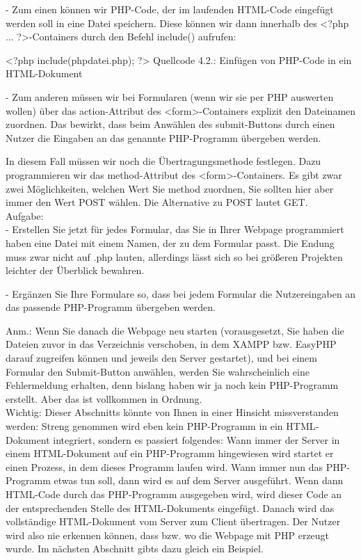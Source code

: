 -	Zum einen können wir PHP-Code, der im laufenden HTML-Code eingefügt werden soll in eine Datei speichern. Diese können wir dann innerhalb des <?php ... ?>-Containers durch den Befehl include() aufrufen:

<?php
include(phpdatei.php);
?>
Quellcode 4.2.: Einfügen von PHP-Code in ein HTML-Dokument

-	Zum anderen müssen wir bei Formularen (wenn wir sie per PHP auswerten wollen) über das action-Attribut des <form>-Containers explizit den Dateinamen zuordnen. Das bewirkt, dass beim Anwählen des submit-Buttons durch einen Nutzer die Eingaben an das genannte PHP-Programm übergeben werden.

In diesem Fall müssen wir noch die Übertragungsmethode festlegen. Dazu programmieren wir das method-Attribut des <form>-Containers. Es gibt zwar zwei Möglichkeiten, welchen Wert Sie method zuordnen, Sie sollten hier aber immer den Wert POST wählen. Die Alternative zu POST lautet GET.\\

Aufgabe:\\

-	Erstellen Sie jetzt für jedes Formular, das Sie in Ihrer Webpage programmiert haben eine Datei mit einem Namen, der zu dem Formular passt. Die Endung muss zwar nicht auf .php lauten, allerdings lässt sich so bei größeren Projekten leichter der Überblick bewahren.

-	Ergänzen Sie Ihre Formulare so, dass bei jedem Formular die Nutzereingaben an das passende PHP-Programm übergeben werden.

Anm.: Wenn Sie danach die Webpage neu starten (vorausgesetzt, Sie haben die Dateien zuvor in das Verzeichnis verschoben, in dem XAMPP bzw. EasyPHP darauf zugreifen können und jeweils den Server gestartet), und bei einem Formular den Submit-Button anwählen, werden Sie wahrscheinlich eine Fehlermeldung erhalten, denn bislang haben wir ja noch kein PHP-Programm erstellt. Aber das ist vollkommen in Ordnung.\\


Wichtig: Dieser Abschnitts könnte von Ihnen in einer Hinsicht missverstanden werden: Streng genommen wird eben kein PHP-Programm in ein HTML-Dokument integriert, sondern es passiert folgendes: Wann immer der Server in einem HTML-Dokument auf ein PHP-Programm hingewiesen wird startet er einen Prozess, in dem dieses Programm laufen wird. Wann immer nun das PHP-Programm etwas tun soll, dann wird es auf dem Server ausgeführt. Wenn dann HTML-Code durch das PHP-Programm ausgegeben wird, wird dieser Code an der entsprechenden Stelle des HTML-Dokuments eingefügt. Danach wird das vollständige HTML-Dokument vom Server zum Client übertragen. Der Nutzer wird also nie erkennen können, dass bzw. wo die Webpage mit PHP erzeugt wurde. Im nächsten Abschnitt gibts dazu gleich ein Beispiel.

